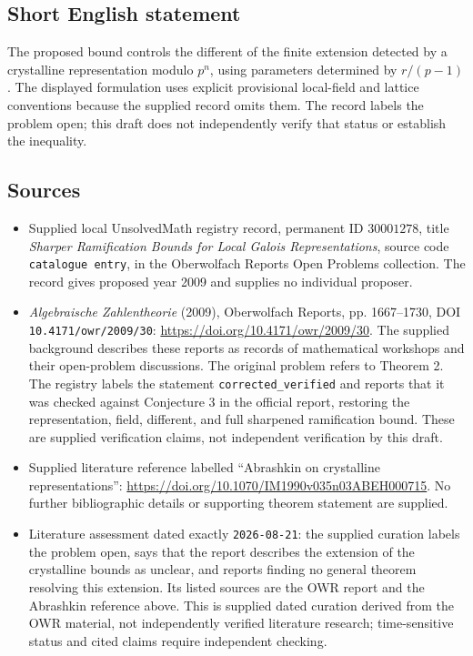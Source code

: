\documentclass[11pt]{article}
\begin{document}
\subsection{Short English statement}
The proposed bound controls the different of the finite extension detected by a crystalline representation modulo \(p^n\), using parameters determined by \(r/(p-1)\). The displayed formulation uses explicit provisional local-field and lattice conventions because the supplied record omits them. The record labels the problem open; this draft does not independently verify that status or establish the inequality.
\subsection{Sources}
\begin{itemize}
\item Supplied local UnsolvedMath registry record, permanent ID \(30001278\), title \emph{Sharper Ramification Bounds for Local Galois Representations}, source code \texttt{catalogue entry}, in the Oberwolfach Reports Open Problems collection. The record gives proposed year 2009 and supplies no individual proposer.
\item \emph{Algebraische Zahlentheorie} (2009), Oberwolfach Reports, pp. 1667--1730, DOI \texttt{10.4171/owr/2009/30}: \url{https://doi.org/10.4171/owr/2009/30}. The supplied background describes these reports as records of mathematical workshops and their open-problem discussions. The original problem refers to Theorem 2. The registry labels the statement \texttt{corrected\_verified} and reports that it was checked against Conjecture 3 in the official report, restoring the representation, field, different, and full sharpened ramification bound. These are supplied verification claims, not independent verification by this draft.
\item Supplied literature reference labelled ``Abrashkin on crystalline representations'': \url{https://doi.org/10.1070/IM1990v035n03ABEH000715}. No further bibliographic details or supporting theorem statement are supplied.
\item Literature assessment dated exactly \texttt{2026-08-21}: the supplied curation labels the problem open, says that the report describes the extension of the crystalline bounds as unclear, and reports finding no general theorem resolving this extension. Its listed sources are the OWR report and the Abrashkin reference above. This is supplied dated curation derived from the OWR material, not independently verified literature research; time-sensitive status and cited claims require independent checking.
\end{itemize}
\end{document}
